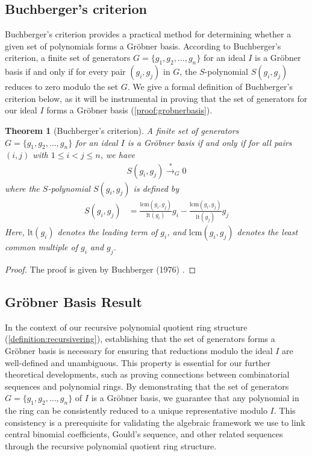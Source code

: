 \documentclass[12pt,reqno]{article}
\theoremstyle{plain}
\newtheorem*{theorem*}{Theorem}
\newcommand{\lcm}{\mathrm{lcm}}
\newcommand{\lt}{\mathrm{lt}}
\begin{document}
\subsection{Buchberger's criterion}
Buchberger's criterion \cite{buchberger1976algorithm} provides a practical method for determining whether a given set of polynomials forms a Gröbner basis. According to Buchberger's criterion, a finite set of generators $G = \{ g_1, g_2, \ldots, g_n \}$ for an ideal $I$ is a Gröbner basis if and only if for every pair $(g_i, g_j)$ in $G$, the $S$-polynomial $S(g_i, g_j)$ reduces to zero modulo the set $G$. We give a formal definition of Buchberger's criterion below, as it will be instrumental in proving that the set of generators for our ideal $I$ forms a Gröbner basis (\cref{proof:grobnerbasis}).

\begin{theorem*}[Buchberger's criterion] \label{proof:buchbergerscriterion}
A finite set of generators $G = \{ g_1, g_2, \ldots, g_n \}$ for an ideal $I$ is a Gröbner basis if and only if for all pairs $(i, j)$ with $1 \leq i < j \leq n$, we have
\begin{align*}
S(g_i, g_j) \xrightarrow{\ast}_G 0
\end{align*}
where the $S$-polynomial $S(g_i, g_j)$ is defined by
\begin{align*}
S(g_i, g_j) &= \frac{\lcm(g_i, g_j)}{\lt(g_i)} g_i - \frac{\lcm(g_i, g_j)}{\lt(g_j)} g_j
\end{align*}
Here, $\lt(g_i)$ denotes the leading term of $g_i$, and $\lcm(g_i,g_j)$ denotes the least common multiple of $g_i$ and $g_j$.
\end{theorem*}
\begin{proof}
The proof is given by Buchberger (1976) \cite{buchberger1976algorithm}.
\end{proof}

\subsection{Gröbner Basis Result}
In the context of our recursive polynomial quotient ring structure (\cref{definition:recursivering}), establishing that the set of generators forms a Gröbner basis is necessary for ensuring that reductions modulo the ideal $I$ are well-defined and unambiguous. This property is essential for our further theoretical developments, such as proving connections between combinatorial sequences and polynomial rings. By demonstrating that the set of generators $G = \{ g_1, g_2, \ldots, g_n \}$ of $I$ is a Gröbner basis, we guarantee that any polynomial in the ring can be consistently reduced to a unique representative modulo $I$. This consistency is a prerequisite for validating the algebraic framework we use to link central binomial coefficients, Gould's sequence, and other related sequences through the recursive polynomial quotient ring structure.
\end{document}
